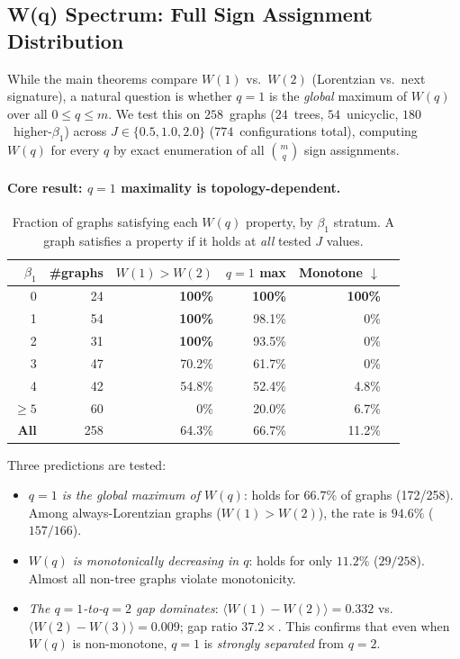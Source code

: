 \documentclass[11pt]{article}
\theoremstyle{definition}
\theoremstyle{remark}
\begin{document}
\subsection{W(q) Spectrum: Full Sign Assignment Distribution}
\label{sec:wq-spectrum}

While the main theorems compare $W(1)$ vs.\ $W(2)$ (Lorentzian vs.\ next
signature), a natural question is whether $q = 1$ is the \emph{global}
maximum of $W(q)$ over all $0 \leq q \leq m$. We test this on
$258$~graphs ($24$~trees, $54$~unicyclic, $180$~higher-$\beta_1$)
across $J \in \{0.5, 1.0, 2.0\}$ ($774$~configurations total), computing
$W(q)$ for every $q$ by exact enumeration of all $\binom{m}{q}$ sign
assignments.

\paragraph{Core result: $q = 1$ maximality is topology-dependent.}

\begin{table}[htbp]
\centering
\caption{Fraction of graphs satisfying each $W(q)$ property, by $\beta_1$ stratum.
A graph satisfies a property if it holds at \emph{all} tested $J$ values.}
\label{tab:wq-spectrum}
\begin{tabular}{@{}rrrrrr@{}}
\toprule
$\beta_1$ & \#graphs & $W(1) > W(2)$ & $q{=}1$ max & Monotone $\downarrow$ \\
\midrule
0   & 24  & \textbf{100\%} & \textbf{100\%} & \textbf{100\%} \\
1   & 54  & \textbf{100\%} & 98.1\%  & 0\%    \\
2   & 31  & \textbf{100\%} & 93.5\%  & 0\%    \\
3   & 47  & 70.2\%  & 61.7\%  & 0\%    \\
4   & 42  & 54.8\%  & 52.4\%  & 4.8\%  \\
$\geq 5$ & 60 & 0\%     & 20.0\%  & 6.7\%  \\
\midrule
\textbf{All} & 258 & 64.3\% & 66.7\% & 11.2\% \\
\bottomrule
\end{tabular}
\end{table}

\noindent Three predictions are tested:
\begin{itemize}
\item[(a)] \emph{$q = 1$ is the global maximum of $W(q)$}: holds for $66.7\%$
  of graphs (172/258). Among always-Lorentzian graphs ($W(1) > W(2)$),
  the rate is $94.6\%$ ($157/166$).
\item[(b)] \emph{$W(q)$ is monotonically decreasing in $q$}: holds for only
  $11.2\%$ ($29/258$). Almost all non-tree graphs violate monotonicity.
\item[(c)] \emph{The $q{=}1$-to-$q{=}2$ gap dominates}:
  $\langle W(1) - W(2) \rangle = 0.332$ vs.\
  $\langle W(2) - W(3) \rangle = 0.009$; gap ratio $37.2\times$.
  This confirms that even when $W(q)$ is non-monotone, $q = 1$ is
  \emph{strongly separated} from $q = 2$.
\end{itemize}
\end{document}

